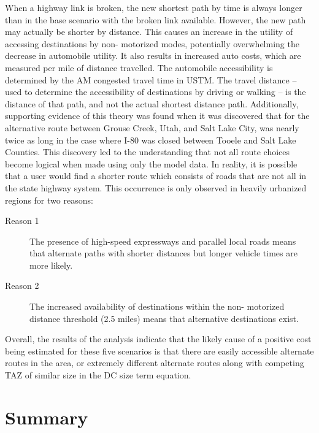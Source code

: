 When a highway link is broken, the new
shortest path by time is always longer than in the base scenario with the broken link
available. However, the new path may actually be shorter by distance. This
causes an increase in the utility of accessing destinations by non-
motorized modes, potentially overwhelming the decrease in automobile
utility. It also results in increased auto costs, which are measured per mile of distance travelled. The automobile accessibility is determined by the AM congested
travel time in USTM. The travel distance
– used to determine the accessibility of destinations by driving or
walking – is the distance of that path, and not the actual shortest
distance path. Additionally,
supporting evidence of this theory was found when it was discovered that for
the alternative route between Grouse Creek, Utah, and Salt Lake City,
was nearly twice as long in the case where I-80 was closed between
Tooele and Salt Lake Counties. This discovery led to the understanding that not all
route choices become logical when made using only the model data. In
reality, it is possible that a user would find a shorter route
which consists of roads that are not all in the state highway system.
This occurrence is only observed in heavily urbanized regions for two reasons:
\begin{description}
	\item [Reason 1]{The presence of high-speed expressways and parallel local roads
  means that alternate paths with shorter distances but longer vehicle
  times are more likely.}
	\item [Reason 2]{The increased availability of destinations within the non-
  motorized distance threshold (2.5 miles) means that alternative
  destinations exist.}
\end{description}

Overall, the results of the analysis indicate that the likely cause of a
positive cost being estimated for these five scenarios is that there are
easily
accessible alternate routes in the area, or extremely different alternate
routes along with competing TAZ of similar size in the DC size term
equation.

\section{Summary}

